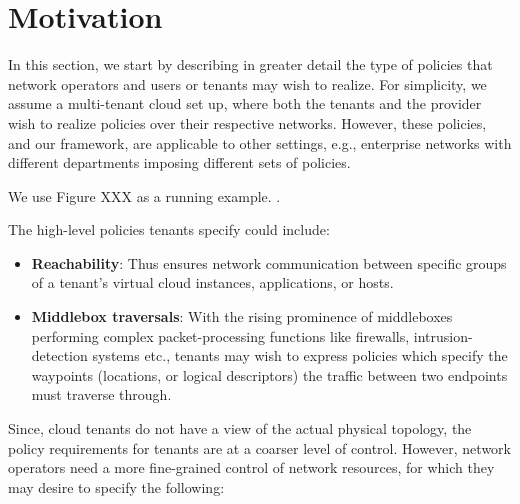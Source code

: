 \section{Motivation}

In this section, we start by describing in greater detail the type of
policies that network operators and users or tenants may wish to
realize. For simplicity, we assume a multi-tenant cloud set up, where
both the tenants and the provider wish to realize policies over their
respective networks. However, these policies, and our framework, are
applicable to other settings, e.g., enterprise networks with different
departments imposing different sets of policies.

We use Figure XXX as a running example. .



The high-level policies tenants specify could include:

\begin{itemize}
\item \textbf{Reachability}: Thus ensures network communication
  between specific groups of a tenant's virtual cloud instances,
  applications, or hosts. 
\item \textbf{Middlebox traversals}: With the rising prominence of
  middleboxes performing complex packet-processing functions like
  firewalls, intrusion-detection systems etc., tenants may wish to
  express policies which specify the waypoints (locations, or logical
  descriptors)  the traffic between two
  endpoints must traverse through. 
\end{itemize}

Since, cloud tenants do not have a view of the actual physical
topology, the policy requirements for tenants are at a coarser level
of control. However, network operators need a more fine-grained
control of network resources, for which they may desire to specify the
following:

